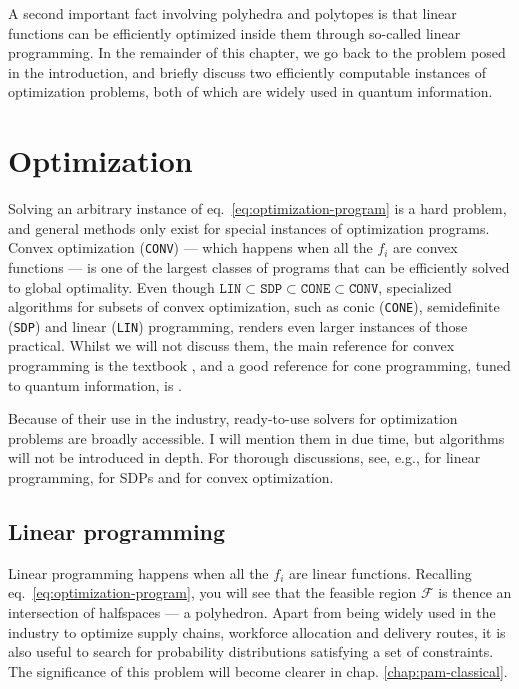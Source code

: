 		A second important fact involving polyhedra and polytopes is that linear functions can be efficiently optimized inside them through so-called linear programming. In the remainder of this chapter, we go back to the problem posed in the introduction, and briefly discuss two efficiently computable instances of optimization problems, both of which are widely used in quantum information.


	\section{Optimization}

		Solving an arbitrary instance of eq.~\eqref{eq:optimization-program} is a hard problem, and general methods only exist for special instances of optimization programs. Convex optimization (\texttt{CONV}) --- which happens when all the $f_i$ are convex functions --- is one of the largest classes of programs that can be efficiently solved to global optimality. Even though $\texttt{LIN} \subset \texttt{SDP} \subset \texttt{CONE} \subset \texttt{CONV}$, specialized algorithms for subsets of convex optimization, such as conic (\texttt{CONE}), semidefinite (\texttt{SDP}) and linear (\texttt{LIN}) programming, renders even larger instances of those practical. Whilst we will not discuss them, the main reference for convex programming is the textbook \cite{boyd_convexoptimization_2004}, and a good reference for cone programming, tuned to quantum information, is \cite{uola_conic_2019}.

		Because of their use in the industry, ready-to-use solvers for optimization problems are broadly accessible. I will mention them in due time, but algorithms will not be introduced in depth. For thorough discussions, see, e.g., \cite{papadimitriou1998combinatorial,matousek2007understanding} for linear programming, \cite{vandenberghe_sdp_1996,gartner2012approximation} for SDPs and \cite{boyd_convexoptimization_2004} for convex optimization.


		\subsection{Linear programming}
		\label{sec:linear-programming}

			Linear programming happens when all the $f_i$ are linear functions. Recalling eq.~\eqref{eq:optimization-program}, you will see that the feasible region $\mathcal{F}$ is thence an intersection of halfspaces --- a polyhedron. Apart from being widely used in the industry to optimize supply chains, workforce allocation and delivery routes, it is also useful to search for probability distributions satisfying a set of constraints. The significance of this problem will become clearer in chap. \ref{chap:pam-classical}.

